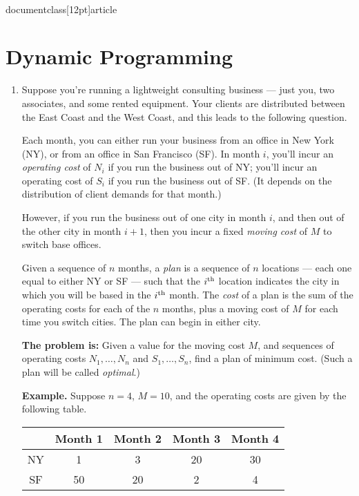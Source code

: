 \\documentclass[12pt]{article}
\begin{document}
\section{Dynamic Programming}


\begin{enumerate}




\item

Suppose you're running a lightweight consulting business ---
just you, two associates, and some rented equipment.
Your clients are distributed between the East Coast and
the West Coast, and this leads to the following question.

Each month, you can either run your business from an office
in New York (NY), or from an office in San Francisco (SF).
In month $i$, you'll incur an {\em operating cost} of $N_i$
if you run the business out of NY; you'll
incur an operating cost of $S_i$
if you run the business out of SF.
(It depends on the distribution of client demands for that month.)

However, if you run the business out of one city in
month $i$, and then out of the other city in month $i + 1$,
then you incur a fixed {\em moving cost} of $M$
to switch base offices.

Given a sequence of $n$ months, a {\em plan} is
a sequence of $n$ locations --- each one equal to either NY or SF ---
such that the $i^{\rm th}$ location indicates the
city in which you will be based in the $i^{\rm th}$ month.
The {\em cost} of a plan is the sum of the operating costs
for each of the $n$ months, plus a moving cost of $M$
for each time you switch cities.
The plan can begin in either city.

{\bf The problem is:} Given a value for the moving cost $M$,
and sequences of operating costs
$N_1, \ldots, N_n$ and $S_1, \ldots, S_n$,
find a plan of minimum cost.
(Such a plan will be called {\em optimal}.)

{\bf Example.}  Suppose $n = 4$, $M = 10$, and the operating costs
are given by the following table.

\begin{table}[h]
\begin{center}
\begin{tabular}{|c||c|c|c|c|}
\hline & Month 1 & Month 2 & Month 3 & Month 4 \\ \hline
NY & 1 & 3 & 20 & 30 \\ \hline
SF & 50 & 20 & 2 & 4 \\ \hline
\end{tabular}
\end{center}
\end{table}


\end{enumerate}
\end{document}

